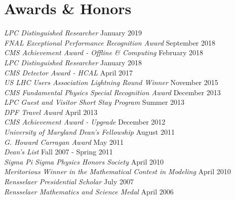 \section{Awards \& Honors}
{\sl LPC Distinguished Researcher} \hfill January 2019\\
{\sl FNAL Exceptional Performance Recognition Award} \hfill September 2018\\
{\sl CMS Achievement Award - Offline \& Computing} \hfill February 2018\\
{\sl LPC Distinguished Researcher} \hfill January 2018\\
{\sl CMS Detector Award - HCAL } \hfill April 2017\\
\ifdefined\longerflag
{\sl US LHC Users Association Lightning Round Winner} \hfill November 2015\\
\fi
{\sl CMS Fundamental Physics Special Recognition Award} \hfill December 2013\\
\ifdefined\longestflag
{\sl LPC Guest and Visitor Short Stay Program} \hfill Summer 2013\\
{\sl DPF Travel Award} \hfill April 2013\\
\fi
{\sl CMS Achievement Award - Upgrade} \hfill December 2012\\
\ifdefined\longerflag
{\sl University of Maryland Dean's Fellowship} \hfill August 2011\\
\fi
{\sl G. Howard Carragan Award} \hfill May 2011%
\ifdefined\longerflag
\\{\sl Dean's List} \hfill Fall 2007 - Spring 2011\\
{\sl Sigma Pi Sigma Physics Honors Society} \hfill April 2010\\
{\sl Meritorious Winner in the Mathematical Contest in Modeling} \hfill April 2010\\
{\sl Rensselaer Presidential Scholar} \hfill July 2007\\
{\sl Rensselaer Mathematics and Science Medal} \hfill April 2006%
\fi